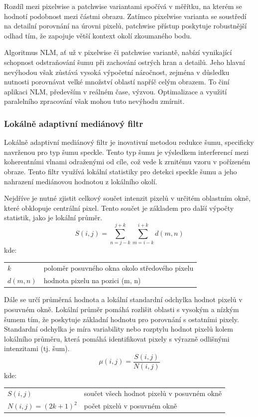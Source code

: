 \documentclass[male,czech,api_ing]{thesis}
\makeatletter
\newenvironment{conditions}[1][kde:]
    {#1 \begin{tabular}[t]{>{$}l<{$} @{${}={}$} >{\raggedright\arraybackslash}p{10cm}}}
    {\end{tabular}}
\makeatother
\begin{document}
Rozdíl mezi pixelwise a patchwise variantami spočívá v měřítku, na kterém se hodnotí podobnost mezi částmi obrazu. Zatímco pixelwise varianta se soustředí na detailní porovnání na úrovni pixelů, patchwise přístup poskytuje robustnější odhad tím, že zapojuje větší kontext okolí zkoumaného bodu.

Algoritmus NLM, ať už v pixelwise či patchwise variantě, nabízí vynikající schopnost odstraňování šumu při zachování ostrých hran a detailů. Jeho hlavní nevýhodou však zůstává vysoká výpočetní náročnost, zejména v důsledku nutnosti porovnávat velké množství oblastí napříč celým obrazem. To činí aplikaci NLM, především v reálném čase, výzvou. Optimalizace a využití paralelního zpracování však mohou tuto nevýhodu zmírnit. \cite{NonLocalMeans}

\subsubsection{Lokálně adaptivní mediánový filtr}
Lokálně adaptivní mediánový filtr je inovativní metodou redukce šumu, specificky navrženou pro typ šumu speckle. Tento typ šumu je výsledkem interferencí mezi koherentními vlnami odraženými od cíle, což vede k zrnitému vzoru v pořízeném obraze. Tento filtr využívá lokální statistiky pro detekci speckle šumu a jeho nahrazení mediánovou hodnotou z lokálního okolí.

Nejdříve je nutné zjistit celkový součet intenzit pixelů v určitém oblastním okně, které obklopuje centrální pixel. Tento součet je základem pro další výpočty statistik, jako je lokální průměr.
\begin{equation}
    S(i, j) = \sum_{n=j-k}^{j+k}\sum_{m=i-k}^{i+k} d(m, n)
\end{equation}
\begin{conditions}
    k & poloměr posuvného okna okolo středového pixelu \\
    d(m, n) & hodnota pixelu na pozici (m, n)
\end{conditions}

Dále se určí průměrná hodnota a lokální standardní odchylka hodnot pixelů v posuvném okně. Lokální průměr pomáhá rozlišit oblasti s vysokým a nízkým šumem tím, že poskytuje základní hodnotu pro porovnání s ostatními pixely. Standardní odchylka je míra variability nebo rozptylu hodnot pixelů kolem lokálního průměru, která pomáhá identifikovat pixely s výrazně odlišnými intenzitami (tj. šum).
\begin{equation}
    \mu(i, j) = \frac{S(i, j)}{N(i, j)}
\end{equation}
\begin{conditions}
    S(i, j) & součet všech hodnot pixelů v posuvném okně \\
    N(i, j) = (2k + 1)^2 & počet pixelů v posuvném okně
\end{conditions}
\end{document}
